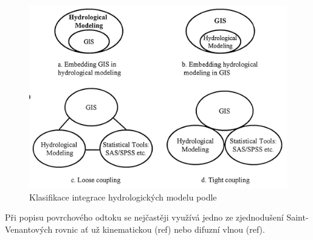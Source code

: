 \begin{figure}
  \centering
  \includegraphics[width=\linewidth]{./img/klasifikaceGISHyd.png}
  \caption{Klasifikace integrace hydrologických modelu podle~\cite{sui1999}}
  \label{fig:klasGISHyd}
\end{figure}

Při popisu povrchového odtoku se nejčastěji využívá jedno ze zjednodušení Saint-Venantových rovnic ať už kinematickou (ref) nebo difuzní vlnou (ref). 
